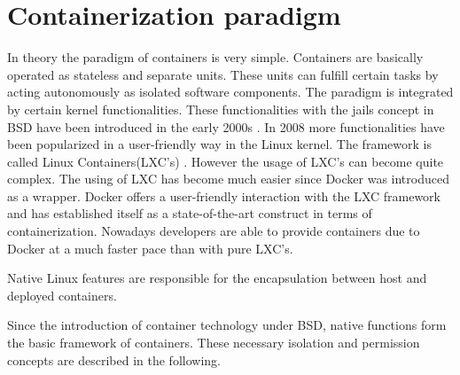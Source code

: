 \section{Containerization paradigm}
\label{sec:intro:containerization}
%
% 
In theory the paradigm of containers is very simple. 
Containers are basically operated as stateless and separate units. 
These units can fulfill certain tasks by acting autonomously as isolated software components.
The paradigm is integrated by certain kernel functionalities. 
These functionalities with the jails concept in BSD have been introduced in the early 2000s \cite{Souppaya:2017aa}.
In 2008 more functionalities have been popularized in a user-friendly way in the Linux kernel.
The framework is called Linux Containers(LXC's) \cite{Souppaya:2017aa}.
However the usage of LXC's can become quite complex.
The using of LXC has become much easier since Docker was introduced as a wrapper.
Docker offers a user-friendly interaction with the LXC framework and has established itself as a state-of-the-art construct in terms of containerization.
Nowadays developers are able to provide containers due to Docker at a much faster pace than with pure LXC's. 
	
Native Linux features are responsible for the encapsulation between host and deployed containers.

Since the introduction of container technology under BSD, native functions form the basic framework of containers.
These necessary isolation and permission concepts are described in the following.